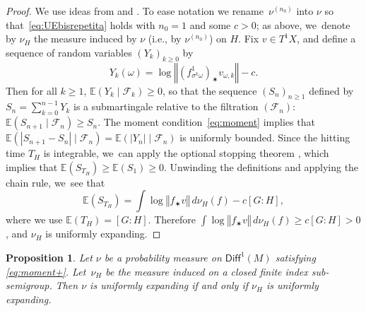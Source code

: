 \documentclass[11pt]{article}
\newcommand{\ie}{i.e.,\xspace}
\newcommand{\norm}[1]{{\left\Vert#1\right\Vert}}
\newcommand{\abs}[1]{\left\vert#1\right\vert}
\newcommand{\ee}{\mathbb{E}}
\newcommand\Diff{{\mathsf{Diff}}}
\theoremstyle{plain}
\newtheorem{pro}[thm]{Proposition}
\theoremstyle{definition}
\numberwithin{equation}{section}
\begin{document}
\begin{proof} We use ideas from \cite[\S 4.3]{liu_thesis} and \cite[Prop.\,2.2]{chung}.
To ease notation we rename~$\nu^{(n_0)}$ into $\nu$ so that~\eqref{eq:UEbisrepetita} holds with $n_0= 1$ and some $c>0$; as above, we~denote by $\nu_H$ the measure induced by $\nu$ (\ie by $\nu^{(n_0)}$) on $H$. Fix
$ v\in T^1X$, and
define a sequence of random variables $(Y_k)_{k\geq 0}$ by
\begin{equation*}
Y_k(\omega) = \log\norm{ (f^1_{\sigma^k\omega})_\varstar v_{\omega, k}}- c.
\end{equation*}
Then for all $k\geq 1$,
$\ee({Y_{k}\mid \mathcal F_{k}})\geq 0$, so that the sequence $(S_n)_{n\geq 1}$
defined by $ S_n = \sum_{k=0}^{n-1} Y_k$ is a submartingale
relative to the filtration $(\mathcal F_n)$: $\ee( S_{n+1}\mid \mathcal F_n)\geq S_{n}$.
The moment condition~\eqref{eq:moment} implies that
$\ee(\abs{S_{n+1}-S_n}\mid \mathcal F_n) = \ee(\abs{Y_n}\mid \mathcal F_n)$ is uniformly bounded.
Since the hitting time $T_H$ is integrable, we~can apply the optional stopping theorem \cite[Th.\,4.7.5]{durrett_book}, which implies that
$\ee(S_{T_H})\geq \ee(S_1)\geq 0$. Unwinding the definitions and applying the chain rule, we~see that
\begin{equation*}
\ee(S_{T_H}) = \int \log \norm{ f_\varstar v}\, d\nu_H(f) - c [G:H],
\end{equation*}
where we use $\ee (T_H) = [G:H]$. Therefore
$\int \log \norm{f_\varstar v}\, d\nu_H(f) \geq c [G:H]>0$, and
$\nu_H$ is uniformly expanding.
\end{proof}

\begin{pro}\label{pro:induced_UE2}
Let $\nu$ be a probability measure on $\Diff^1(M)$ satisfying \eqref{eq:moment+}. Let~$\nu_H$ be the measure induced on a closed
finite index sub-semigroup. Then $\nu$ is uniformly expanding if and only if $\nu_H$ is uniformly expanding.
\end{pro}
\end{document}
